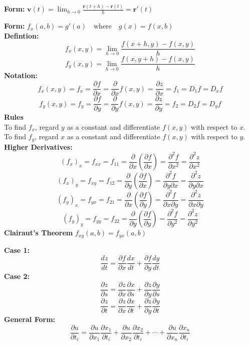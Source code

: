 \documentclass[2pt]{article}
\begin{document}
\begin{multicols}{2}
\begin{tcolorbox}[title=\textbf{Motion in space}, colframe=lightblue]
    \textbf{Form:} 	$ \mathbf{v}(t) = \lim_{{h \to 0}} \frac{\mathbf{r}(t + h) - \mathbf{r}(t)}{h} = \mathbf{r}'(t) $ 
\end{tcolorbox}

\begin{tcolorbox}[title=\textbf{Partial Derivatives}, colframe=lightblue]
    \textbf{Form:} 	$ f_x(a, b) = g'(a) \quad \text{where} \quad g(x) = f(x, b) $ \\
    \textbf{Defintion:} 
    \[f_x(x, y) = \lim_{{h \to 0}} \frac{f(x + h, y) - f(x, y)}{h}\]
    \[f_y(x, y) = \lim_{{h \to 0}} \frac{f(x, y + h) - f(x, y)}{h}\]
    \textbf{Notation:} 
    \[ f_x(x, y) = f_x = \frac{\partial f}{\partial x} = \frac{\partial}{\partial x} f(x, y) = \frac{\partial z}{\partial x} = f_1 = D_1 f = D_x f \]
    \[ f_y(x, y) = f_y = \frac{\partial f}{\partial y} = \frac{\partial}{\partial y} f(x, y) = \frac{\partial z}{\partial y} = f_2 = D_2 f = D_y f \]
    \textbf{Rules} \\
    To find $f_x$, regard $y$ as a constant and differentiate $f(x, y)$ with respect to $x$.\\
    To find $f_y$, regard $x$ as a constant and differentiate $f(x, y)$ with respect to $y$. \\
    \textbf{Higher Derivatives:}
    \[(f_x)_x = f_{xx} = f_{11} = \frac{\partial}{\partial x} \left( \frac{\partial f}{\partial x} \right) = \frac{\partial^2 f}{\partial x^2} = \frac{\partial^2 z}{\partial x^2}\]
    \[(f_x)_y = f_{xy} = f_{12} = \frac{\partial}{\partial y} \left( \frac{\partial f}{\partial x} \right) = \frac{\partial^2 f}{\partial y \partial x} = \frac{\partial^2 z}{\partial y \partial x} \]
    \[ (f_y)_x = f_{yx} = f_{21} = \frac{\partial}{\partial x} \left( \frac{\partial f}{\partial y} \right) = \frac{\partial^2 f}{\partial x \partial y} = \frac{\partial^2 z}{\partial x \partial y} \]
    \[(f_y)_y = f_{yy} = f_{22} = \frac{\partial}{\partial y} \left( \frac{\partial f}{\partial y} \right) = \frac{\partial^2 f}{\partial y^2} = \frac{\partial^2 z}{\partial y^2} \]
    \textbf{Clairaut's Theorem} $ f_{xy}(a, b) = f_{yx}(a, b) $
\end{tcolorbox}

\begin{tcolorbox}[title=\textbf{Chain Rule}, colframe=lightblue]
    \textbf{Case 1:} 	
    \[ \frac{dz}{dt} = \frac{\partial f}{\partial x} \frac{dx}{dt} + \frac{\partial f}{\partial y} \frac{dy}{dt} \]
    \textbf{Case 2:}
    \[ \frac{\partial z}{\partial s} = \frac{\partial z}{\partial x} \frac{\partial x}{\partial s} + \frac{\partial z}{\partial y} \frac{\partial y}{\partial s} \]
    \[ \frac{\partial z}{\partial t} = \frac{\partial z}{\partial x} \frac{\partial x}{\partial t} + \frac{\partial z}{\partial y} \frac{\partial y}{\partial t} \]
    \textbf{General Form:}
    \[ \frac{\partial u}{\partial t_i} = \frac{\partial u}{\partial x_1} \frac{\partial x_1}{\partial t_i} + \frac{\partial u}{\partial x_2} \frac{\partial x_2}{\partial t_i} + \cdots + \frac{\partial u}{\partial x_n} \frac{\partial x_n}{\partial t_i} \]
\end{tcolorbox}


\end{multicols}
\end{document}
